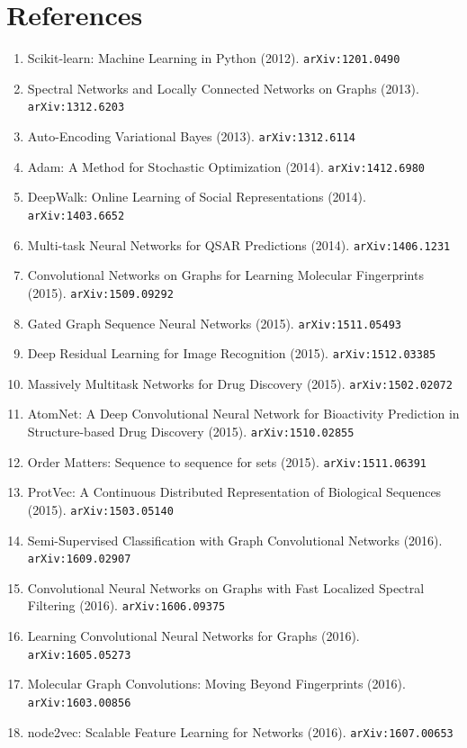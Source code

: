 \documentclass[11pt]{article}
\begin{document}
\section*{References}
\begin{enumerate}\small
  \item Scikit-learn: Machine Learning in Python (2012). \texttt{arXiv:1201.0490}
  \item Spectral Networks and Locally Connected Networks on Graphs (2013). \texttt{arXiv:1312.6203}
  \item Auto-Encoding Variational Bayes (2013). \texttt{arXiv:1312.6114}
  \item Adam: A Method for Stochastic Optimization (2014). \texttt{arXiv:1412.6980}
  \item DeepWalk: Online Learning of Social Representations (2014). \texttt{arXiv:1403.6652}
  \item Multi-task Neural Networks for QSAR Predictions (2014). \texttt{arXiv:1406.1231}
  \item Convolutional Networks on Graphs for Learning Molecular Fingerprints (2015). \texttt{arXiv:1509.09292}
  \item Gated Graph Sequence Neural Networks (2015). \texttt{arXiv:1511.05493}
  \item Deep Residual Learning for Image Recognition (2015). \texttt{arXiv:1512.03385}
  \item Massively Multitask Networks for Drug Discovery (2015). \texttt{arXiv:1502.02072}
  \item AtomNet: A Deep Convolutional Neural Network for Bioactivity Prediction
  in Structure-based Drug Discovery (2015). \texttt{arXiv:1510.02855}
  \item Order Matters: Sequence to sequence for sets (2015). \texttt{arXiv:1511.06391}
  \item ProtVec: A Continuous Distributed Representation of Biological Sequences (2015). \texttt{arXiv:1503.05140}
  \item Semi-Supervised Classification with Graph Convolutional Networks (2016). \texttt{arXiv:1609.02907}
  \item Convolutional Neural Networks on Graphs with Fast Localized Spectral
  Filtering (2016). \texttt{arXiv:1606.09375}
  \item Learning Convolutional Neural Networks for Graphs (2016). \texttt{arXiv:1605.05273}
  \item Molecular Graph Convolutions: Moving Beyond Fingerprints (2016). \texttt{arXiv:1603.00856}
  \item node2vec: Scalable Feature Learning for Networks (2016). \texttt{arXiv:1607.00653}

\end{enumerate}
\end{document}
